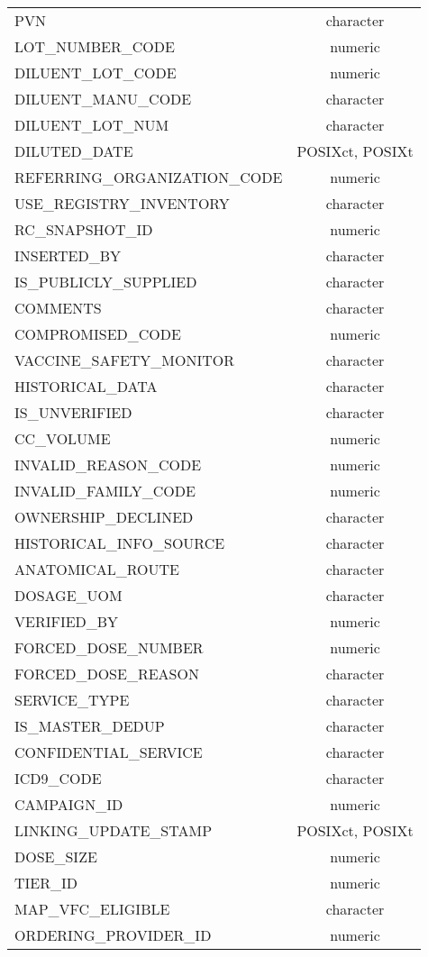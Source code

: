 \documentclass[
  letterpaper,
  DIV=11,
  numbers=noendperiod]{scrreprt}
\begin{document}
\begin{longtable}{lc}
PVN & character \\ 
LOT\_NUMBER\_CODE & numeric \\ 
DILUENT\_LOT\_CODE & numeric \\ 
DILUENT\_MANU\_CODE & character \\ 
DILUENT\_LOT\_NUM & character \\ 
DILUTED\_DATE & POSIXct, POSIXt \\ 
REFERRING\_ORGANIZATION\_CODE & numeric \\ 
USE\_REGISTRY\_INVENTORY & character \\ 
RC\_SNAPSHOT\_ID & numeric \\ 
INSERTED\_BY & character \\ 
IS\_PUBLICLY\_SUPPLIED & character \\ 
COMMENTS & character \\ 
COMPROMISED\_CODE & numeric \\ 
VACCINE\_SAFETY\_MONITOR & character \\ 
HISTORICAL\_DATA & character \\ 
IS\_UNVERIFIED & character \\ 
CC\_VOLUME & numeric \\ 
INVALID\_REASON\_CODE & numeric \\ 
INVALID\_FAMILY\_CODE & numeric \\ 
OWNERSHIP\_DECLINED & character \\ 
HISTORICAL\_INFO\_SOURCE & character \\ 
ANATOMICAL\_ROUTE & character \\ 
DOSAGE\_UOM & character \\ 
VERIFIED\_BY & numeric \\ 
FORCED\_DOSE\_NUMBER & numeric \\ 
FORCED\_DOSE\_REASON & character \\ 
SERVICE\_TYPE & character \\ 
IS\_MASTER\_DEDUP & character \\ 
CONFIDENTIAL\_SERVICE & character \\ 
ICD9\_CODE & character \\ 
CAMPAIGN\_ID & numeric \\ 
LINKING\_UPDATE\_STAMP & POSIXct, POSIXt \\ 
DOSE\_SIZE & numeric \\ 
TIER\_ID & numeric \\ 
MAP\_VFC\_ELIGIBLE & character \\ 
ORDERING\_PROVIDER\_ID & numeric \\ 

\end{longtable}
\end{document}
